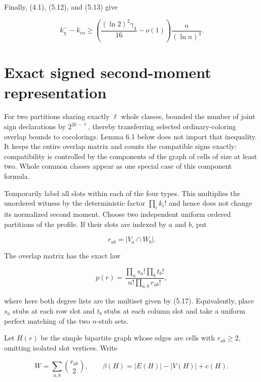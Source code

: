 \documentclass[11pt,reqno]{amsart}
\begin{document}
Finally, (4.1), (5.12), and (5.13) give

\[
 k_\chi^- -k_{\mathrm{co}}
 \ge\left(\frac{(\ln 2)^2\gamma_4}{16}-o(1)\right)
       \frac n{(\ln n)^3}.                                    \tag{5.20}
\]

\section{Exact signed second-moment
representation}\label{exact-signed-second-moment-representation}

For two partitions sharing exactly \(\ell\) whole classes,
\citet[Proposition~6]{heckel-2025-difference} bounded the number of joint
sign declarations by \(2^{2k-\ell}\), thereby transferring selected
ordinary-coloring overlap bounds to cocolorings.  Lemma 6.1 below does
not import that inequality.  It keeps the entire overlap matrix and counts
the compatible signs exactly: compatibility is controlled by the
components of the graph of cells of size at least two.  Whole common
classes appear as one special case of this component formula.

Temporarily label all slots within each of the four types. This
multiplies the unordered witness by the deterministic factor
\(\prod_i k_i!\) and hence does not change its normalized second
moment. Choose two independent uniform ordered partitions of the
profile. If their slots are indexed by \(a\) and \(b\), put

\[
 r_{ab}=|V_a\cap W_b|.                                   \tag{6.1}
\]

The overlap matrix has the exact law

\[
 p(r)=\frac{\prod_a s_a!\prod_b t_b!}
            {n!\prod_{a,b}r_{ab}!},                      \tag{6.2}
\]

where here both degree lists are the multiset given by (5.17).
Equivalently, place \(s_a\) stubs at each row slot and
\(t_b\) stubs at each column slot and take a uniform perfect
matching of the two \(n\)-stub sets.

Let \(H(r)\) be the simple bipartite graph whose edges are cells
with \(r_{ab}\ge 2\), omitting isolated slot vertices.
Write

\[
 W=\sum_{a,b}\binom{r_{ab}}2,\qquad
 \beta(H)=|E(H)|-|V(H)|+c(H).                             \tag{6.3}
\]
\end{document}
